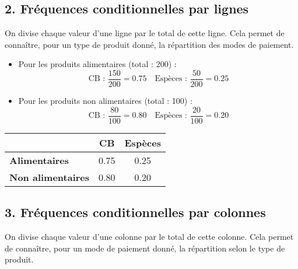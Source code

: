\documentclass[answers]{exam}
\begin{document}
\begin{solution}
  \subsection*{2. Fréquences conditionnelles par lignes}

  On divise chaque valeur d'une ligne par le total de cette ligne. Cela permet de connaître, pour un type de produit donné, la répartition des modes de paiement.
  
  \begin{itemize}
      \item Pour les produits alimentaires (total : 200) :
      \[
      \text{CB : } \frac{150}{200} = 0.75 \quad \text{Espèces : } \frac{50}{200} = 0.25
      \]
      \item Pour les produits non alimentaires (total : 100) :
      \[
      \text{CB : } \frac{80}{100} = 0.80 \quad \text{Espèces : } \frac{20}{100} = 0.20
      \]
  \end{itemize}
  
  \begin{center}
  \begin{tabular}{>{\bfseries}lcc}
  \toprule
   & CB & Espèces \\
  \midrule
  Alimentaires & 0.75 & 0.25 \\
  Non alimentaires & 0.80 & 0.20 \\
  \bottomrule
  \end{tabular}
  \end{center}
  
  \vspace{1em}
  
  \subsection*{3. Fréquences conditionnelles par colonnes}
  
  On divise chaque valeur d'une colonne par le total de cette colonne. Cela permet de connaître, pour un mode de paiement donné, la répartition selon le type de produit.
\end{solution}

\newpage
\clearpage
\end{document}

